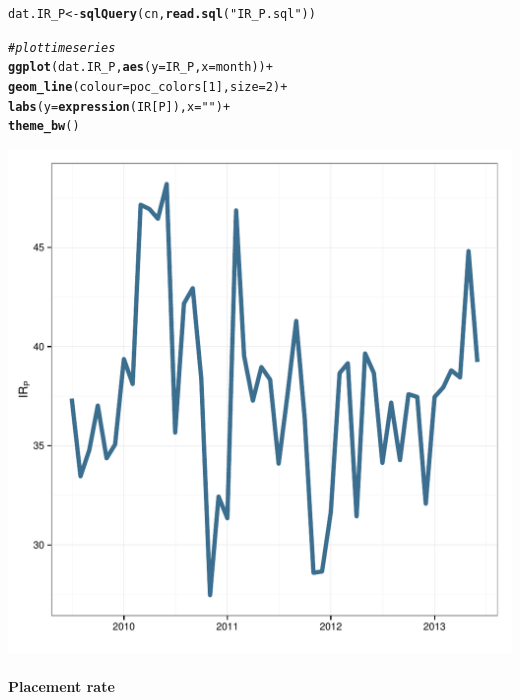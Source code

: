 \documentclass[12pt]{article}\usepackage[]{graphicx}\usepackage[]{color}
\makeatletter
\def\maxwidth{ %
  \ifdim\Gin@nat@width>\linewidth
    \linewidth
  \else
    \Gin@nat@width
  \fi
}
\newcommand{\hlnum}[1]{\textcolor[rgb]{0.686,0.059,0.569}{#1}}%
\newcommand{\hlstr}[1]{\textcolor[rgb]{0.192,0.494,0.8}{#1}}%
\newcommand{\hlcom}[1]{\textcolor[rgb]{0.678,0.584,0.686}{\textit{#1}}}%
\newcommand{\hlopt}[1]{\textcolor[rgb]{0,0,0}{#1}}%
\newcommand{\hlstd}[1]{\textcolor[rgb]{0.345,0.345,0.345}{#1}}%
\newcommand{\hlkwb}[1]{\textcolor[rgb]{0.69,0.353,0.396}{#1}}%
\newcommand{\hlkwc}[1]{\textcolor[rgb]{0.333,0.667,0.333}{#1}}%
\newcommand{\hlkwd}[1]{\textcolor[rgb]{0.737,0.353,0.396}{\textbf{#1}}}%
\newenvironment{kframe}{%
 \def\at@end@of@kframe{}%
 \ifinner\ifhmode%
  \def\at@end@of@kframe{\end{minipage}}%
  \begin{minipage}{\columnwidth}%
 \fi\fi%
 \def\FrameCommand##1{\hskip\@totalleftmargin \hskip-\fboxsep
 \colorbox{shadecolor}{##1}\hskip-\fboxsep
     \hskip-\linewidth \hskip-\@totalleftmargin \hskip\columnwidth}%
 \MakeFramed {\advance\hsize-\width
   \@totalleftmargin\z@ \linewidth\hsize
   \@setminipage}}%
 {\par\unskip\endMakeFramed%
 \at@end@of@kframe}
\newenvironment{knitrout}{}{} %
\makeatother
\begin{document}
\begin{knitrout}
\color{fgcolor}\begin{kframe}
\begin{alltt}
\hlstd{dat.IR_P} \hlkwb{<-} \hlkwd{sqlQuery}\hlstd{(cn,} \hlkwd{read.sql}\hlstd{(}\hlstr{"IR_P.sql"}\hlstd{))}

\hlcom{#plot time series}
\hlkwd{ggplot}\hlstd{(dat.IR_P,} \hlkwd{aes}\hlstd{(}\hlkwc{y}\hlstd{=IR_P,} \hlkwc{x}\hlstd{=month))} \hlopt{+}
  \hlkwd{geom_line}\hlstd{(}\hlkwc{colour}\hlstd{=poc_colors[}\hlnum{1}\hlstd{],} \hlkwc{size}\hlstd{=}\hlnum{2}\hlstd{)} \hlopt{+}
  \hlkwd{labs}\hlstd{(}\hlkwc{y} \hlstd{=} \hlkwd{expression}\hlstd{(IR[P]),} \hlkwc{x} \hlstd{=} \hlstr{""}\hlstd{)} \hlopt{+}
  \hlkwd{theme_bw}\hlstd{()}
\end{alltt}
\end{kframe}

{\centering \includegraphics[width=\maxwidth]{figure/IR_P} 

}



\end{knitrout}

\paragraph{Placement rate}
\end{document}
